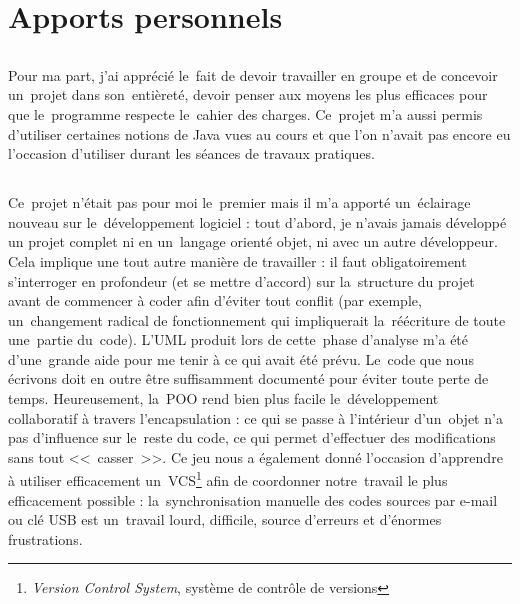\section{Apports personnels}

\subsection{\mlq}
Pour ma part, j'ai apprécié le~fait de devoir travailler en groupe et de concevoir un~projet dans son~entièreté,
devoir penser aux moyens les plus efficaces pour que le~programme respecte le~cahier des charges. 
Ce~projet m'a aussi permis d'utiliser certaines notions de Java vues au cours et que l'on n'avait pas encore eu 
l'occasion d'utiliser durant les séances de travaux pratiques.   

\subsection{\ghs}
Ce~projet n'était pas pour moi le~premier mais il m'a apporté un~éclairage nouveau sur le~développement logiciel : 
tout d'abord, je n'avais jamais développé un projet complet ni en un~langage orienté objet, ni avec un autre développeur. 
Cela implique une tout autre manière de travailler : il faut obligatoirement s'interroger en profondeur (et se mettre d'accord) 
sur la~structure du projet avant de commencer à coder afin d'éviter tout conflit (par exemple, un~changement radical 
de fonctionnement qui impliquerait la~réécriture de toute une~partie du~code). 
L'UML produit lors de cette~phase d'analyse m'a été d'une~grande aide pour me tenir à ce qui avait été prévu. 
Le~code que nous écrivons doit en outre être suffisamment documenté pour éviter toute perte de temps.
Heureusement, la~POO rend bien plus facile le~développement collaboratif à travers l'encapsulation : ce qui se passe à l'intérieur 
d'un~objet n'a pas d'influence sur le~reste du code, ce qui permet d'effectuer des modifications sans tout <<~casser~>>. 
Ce jeu nous a également donné l'occasion d'apprendre à utiliser efficacement 
un~VCS\footnote{\emph{Version Control System}, système de contrôle de versions} 
afin de coordonner notre~travail le plus efficacement possible : la~synchronisation manuelle des codes sources par e-mail ou 
clé USB est un~travail lourd, difficile, source d'erreurs et d'énormes frustrations.
